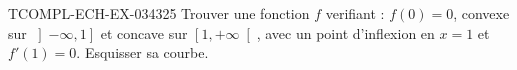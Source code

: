 \begin{exercice}{TCOMPL-ECH-EX-034}{3}{25}
Trouver une fonction $f$ verifiant : $f(0)=0$, convexe sur $\left]-\infty, 1\right]$ et concave sur $\left[1, +\infty\right[$, avec un point d'inflexion en $x=1$ et $f'(1)=0$. Esquisser sa courbe.

\end{exercice}
